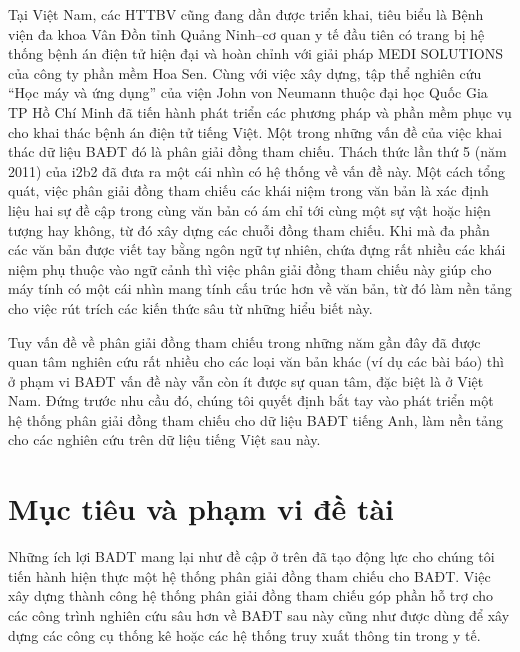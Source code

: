 Tại Việt Nam, các HTTBV cũng đang dần được triển khai, tiêu biểu là Bệnh viện đa khoa Vân Đồn tỉnh Quảng Ninh--cơ quan y tế đầu tiên có trang bị hệ thống bệnh án điện tử hiện đại và hoàn chỉnh với giải pháp MEDI SOLUTIONS của công ty phần mềm Hoa Sen. Cùng với việc xây dựng, tập thể nghiên cứu ``Học máy và ứng dụng'' của viện John von Neumann thuộc đại học Quốc Gia TP Hồ Chí Minh đã tiến hành phát triển các phương pháp và phần mềm phục vụ cho khai thác bệnh án điện tử tiếng Việt. Một trong những vấn đề của việc khai thác dữ liệu BAĐT đó là phân giải đồng tham chiếu. Thách thức lần thứ 5 (năm 2011) của i2b2 đã đưa ra một cái nhìn có hệ thống về vấn đề này. Một cách tổng quát, việc phân giải đồng tham chiếu các khái niệm trong văn bản là xác định liệu hai sự đề cập trong cùng văn bản có ám chỉ tới cùng một sự vật hoặc hiện tượng hay không, từ đó xây dựng các chuỗi đồng tham chiếu. Khi mà đa phần các văn bản được viết tay bằng ngôn ngữ tự nhiên, chứa đựng rất nhiều các khái niệm phụ thuộc vào ngữ cảnh thì việc phân giải đồng tham chiếu này giúp cho máy tính có một cái nhìn mang tính cấu trúc hơn về văn bản, từ đó làm nền tảng cho việc rút trích các kiến thức sâu từ những hiểu biết này.

Tuy vấn đề về phân giải đồng tham chiếu trong những năm gần đây đã được quan tâm nghiên cứu rất nhiều cho các loại văn bản khác (ví dụ các bài báo) thì ở phạm vi BAĐT vấn đề này vẫn còn ít được sự quan tâm, đặc biệt là ở Việt Nam. Đứng trước nhu cầu đó, chúng tôi quyết định bắt tay vào phát triển một hệ thống phân giải đồng tham chiếu cho dữ liệu BAĐT tiếng Anh, làm nền tảng cho các nghiên cứu trên dữ liệu tiếng Việt sau này.

\section{Mục tiêu và phạm vi đề tài}
Những ích lợi BADT mang lại như đề cập ở trên đã tạo động lực cho chúng tôi tiến hành hiện thực một hệ thống phân giải đồng tham chiếu cho BAĐT. Việc xây dựng thành công hệ thống phân giải đồng tham chiếu góp phần hỗ trợ cho các công trình nghiên cứu sâu hơn về BAĐT sau này cũng như được dùng để xây dựng các công cụ thống kê hoặc các hệ thống truy xuất thông tin trong y tế.

